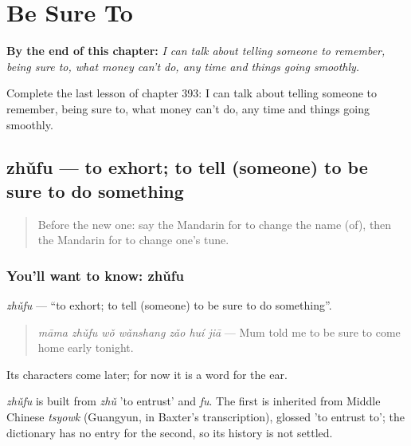 
\chapter{Be Sure To}
\label{ch:zh-be-sure-to}

\begin{chapteropening}
\textbf{By the end of this chapter:} \emph{I can talk about telling someone to remember, being sure to, what money can't do, any time and things going smoothly.}

Complete the last lesson of chapter 393: I can talk about telling someone to remember, being sure to, what money can't do, any time and things going smoothly.
\end{chapteropening}

\section[zhǔfu]{zhǔfu — to exhort; to tell (someone) to be sure to do something}

\label{lesson:ZH-C393-zhufu}



\begin{quote}
Before the new one: say the Mandarin for to change the name (of), then the Mandarin for to change one's tune.
\end{quote}

\subsection*{You'll want to know: zhǔfu}
\emph{zhǔfu} — \textquotedblleft{}to exhort; to tell (someone) to be sure to do something\textquotedblright{}.

\begin{quote}
\emph{māma zhǔfu wǒ wǎnshang zǎo huí jiā} — Mum told me to be sure to come home early tonight.
\end{quote}

Its characters come later; for now it is a word for the ear.

\begin{cousinweb}
\emph{zhǔfu} is built from \emph{zhǔ} 'to entrust' and \emph{fu}. The first is inherited from Middle Chinese \emph{tsyowk} (Guangyun, in Baxter's transcription), glossed 'to entrust to'; the dictionary has no entry for the second, so its history is not settled.
\end{cousinweb}


